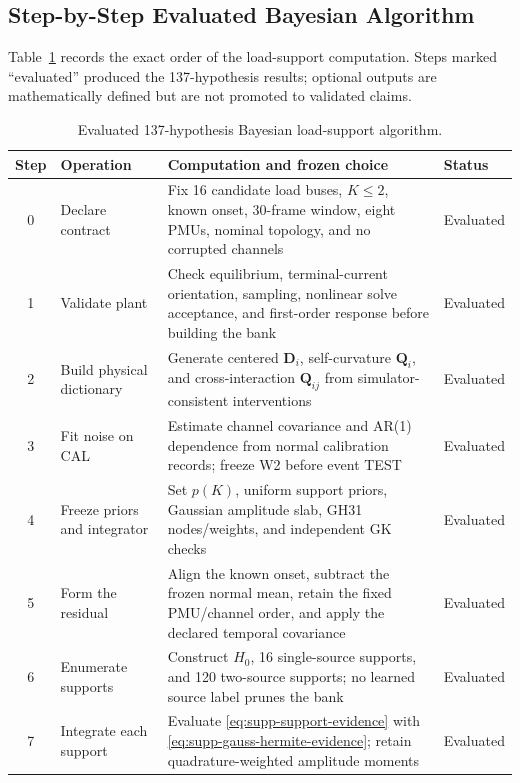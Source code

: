 \subsection{Step-by-Step Evaluated Bayesian Algorithm}

Table~\ref{tab:supp-evaluated-algorithm} records the exact order of the load-support computation. Steps marked ``evaluated'' produced the 137-hypothesis results; optional outputs are mathematically defined but are not promoted to validated claims.

\begin{table}[t]
\caption{Evaluated 137-hypothesis Bayesian load-support algorithm.}
\label{tab:supp-evaluated-algorithm}
\centering
\scriptsize
\setlength{\tabcolsep}{4pt}
\begin{tabularx}{\textwidth}{@{}c l X l@{}}
\toprule
Step & Operation & Computation and frozen choice & Status \\
\midrule
0 & Declare contract & Fix 16 candidate load buses, $K\le2$, known onset, 30-frame window, eight PMUs, nominal topology, and no corrupted channels & Evaluated \\
1 & Validate plant & Check equilibrium, terminal-current orientation, sampling, nonlinear solve acceptance, and first-order response before building the bank & Evaluated \\
2 & Build physical dictionary & Generate centered $\bm D_i$, self-curvature $\bm Q_i$, and cross-interaction $\bm Q_{ij}$ from simulator-consistent interventions & Evaluated \\
3 & Fit noise on CAL & Estimate channel covariance and AR(1) dependence from normal calibration records; freeze W2 before event TEST & Evaluated \\
4 & Freeze priors and integrator & Set $p(K)$, uniform support priors, Gaussian amplitude slab, GH31 nodes/weights, and independent GK checks & Evaluated \\
5 & Form the residual & Align the known onset, subtract the frozen normal mean, retain the fixed PMU/channel order, and apply the declared temporal covariance & Evaluated \\
6 & Enumerate supports & Construct $H_0$, 16 single-source supports, and 120 two-source supports; no learned source label prunes the bank & Evaluated \\
7 & Integrate each support & Evaluate \eqref{eq:supp-support-evidence} with \eqref{eq:supp-gauss-hermite-evidence}; retain quadrature-weighted amplitude moments & Evaluated \\

\end{tabularx}
\end{table}

